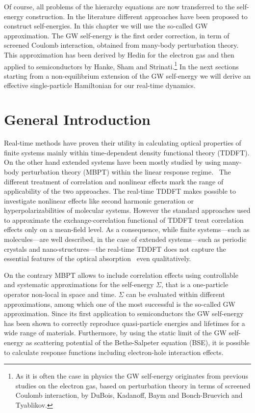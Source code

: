 Of course, all problems of the hierarchy equations are now transferred to the self-energy construction.
In the literature different approaches have been proposed to construct self-energies. In this chapter we will use the so-called GW approximation. The GW self-energy is the first order correction, in term of screened Coulomb interaction, obtained from many-body perturbation theory\cite{aryasetiawan1998gw}. This approximation has been derived by Hedin\cite{hedin1999correlation} for the electron gas and then applied to semiconductors by Hanke, Sham and Strinati\cite{PhysRevB.25.2867}.\footnote{As it is often the case in  physics the GW self-energy originates from previous studies on the electron gas, based on perturbation theory in terms of screened Coulomb interaction, by DuBois, Kadanoff, Baym and Bonch-Bruevich and Tyablikov.} In the next sections starting from a non-equilibrium extension of the GW self-energy\cite{PhysRevB.69.205204} we will derive an effective single-particle Hamiltonian for our real-time dynamics. 

\section{General Introduction}

Real-time methods have proven their utility in calculating optical properties of finite systems mainly within time-dependent density functional
theory (TDDFT).\cite{PhysRevB.62.7998,PSSB:PSSB200642067,sun:234107} On the other hand extended systems have been mostly studied by using many-body  perturbation
theory (MBPT) within the linear response regime.~\cite{strinati} 
The different treatment of correlation and nonlinear effects mark the range of applicability of the two approaches. The real-time TDDFT makes
possible to investigate nonlinear effects like second harmonic generation\cite{takimoto:154114} or hyperpolarizabilities of 
molecular systems.\cite{PSSB:PSSB200642067} However the standard approaches used to approximate the exchange-correlation functional of TDDFT 
treat correlation effects only on a mean-field level. As a consequence, while finite systems---such as molecules---are well described, in the case of extended systems---such as periodic crystals and nano-structures---the real-time TDDFT does not capture the essential features of the optical absorption~\cite{Onida} even qualitatively. 

On the contrary MBPT allows to include correlation effects using controllable and systematic approximations for the self-energy $\Sigma$,
that is a one-particle operator non-local in space and time.
$\Sigma$ can be evaluated within different approximations, among which one of the most successful is the so-called GW
approximation.\cite{Aulbur19991}
Since its first application to semiconductors\cite{PhysRevLett.45.290} the GW self-energy has been shown to
correctly reproduce quasi-particle energies and lifetimes for a wide range of materials.\cite{Aulbur19991}
Furthermore, by using the static limit of the GW self-energy as scattering potential of the
Bethe-Salpeter equation (BSE),\cite{strinati} it is possible to calculate response functions including electron-hole interaction
effects.

